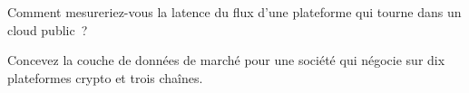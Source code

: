 \begin{interviewq}\label{iq:m3:crypto-data-and-infrastructure:5}
Comment mesureriez-vous la latence du flux d'une plateforme qui tourne dans un cloud public~?
\end{interviewq}

\begin{interviewq}\label{iq:m3:crypto-data-and-infrastructure:6}
Concevez la couche de données de marché pour une société qui négocie sur dix plateformes crypto et trois chaînes.
\end{interviewq}
